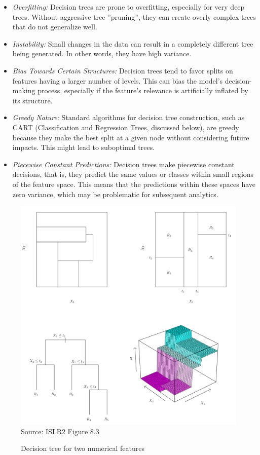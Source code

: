 \begin{itemize}
\item \emph{Overfitting:} Decision trees are prone to overfitting, especially for very deep trees. Without aggressive tree ''pruning'', they can create overly complex trees that do not generalize well.

\item \emph{Instability:} Small changes in the data can result in a completely different tree being generated. In other words, they have high variance.

\item \emph{Bias Towards Certain Structures:} Decision trees tend to favor splits on features having a larger number of levels. This can bias the model's decision-making process, especially if the feature's relevance is artificially inflated by its structure.

\item \emph{Greedy Nature:} Standard algorithms for decision tree construction, such as CART (Classification and Regression Trees, discussed below), are greedy because they make the best split at a given node without considering future impacts. This might lead to suboptimal trees.

\item \emph{Piecewise Constant Predictions:} Decision trees make piecewise constant decisions, that is, they predict the same values or classes within small regions of the feature space. This means that the predictions within these spaces have zero variance, which may be problematic for subsequent analytics. 
\end{itemize}


\begin{figure}
\centering
\includegraphics[width=.75\textwidth]{../class11/Figures_Chapters_7-13/Chapter8/8_3.pdf} \\

\scriptsize Source: ISLR2 Figure 8.3
\caption{Decision tree for two numerical features}
\label{fig:decisiontree}
\end{figure}

